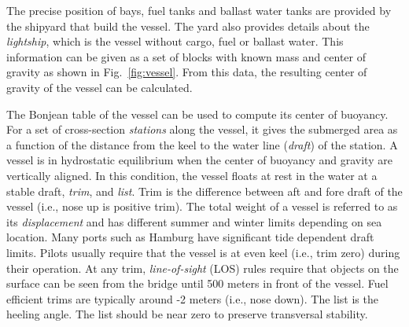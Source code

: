 \documentclass[runningheads]{llncs}
\begin{document}
The precise position of bays, fuel tanks and ballast water tanks are provided by the shipyard that build the vessel. The yard also provides details about the {\em lightship}, which is the vessel without cargo, fuel or ballast water. This information can be given as a set of blocks with known mass and center of gravity as shown in Fig.~\ref{fig:vessel}.
From this data, the resulting center of gravity of the vessel can be calculated. 

The Bonjean table of the vessel can be used to compute its center of buoyancy. For a set of cross-section {\em stations} along the vessel, it gives the submerged area as a function of the distance from the keel to the water line ({\em draft}) of the station. A vessel is in hydrostatic equilibrium when the center of buoyancy and gravity are vertically aligned. In this condition, the vessel floats at rest in the water at a stable draft, {\em trim}, and {\em list}. Trim is the difference between aft and fore draft of the vessel (i.e., nose up is positive trim). The total weight of a vessel is referred to as its {\em displacement} and has different summer and winter limits depending on sea location. Many ports such as Hamburg have significant tide dependent draft limits. Pilots usually require that the vessel is at even keel (i.e., trim zero) during their operation. At any trim, {\em line-of-sight} (LOS) rules require that objects on the surface can be seen from the bridge until 500 meters in front of the vessel. Fuel efficient trims are typically around -2 meters (i.e., nose down). The list is the heeling angle. The list should be near zero to preserve transversal stability. 
\end{document}
